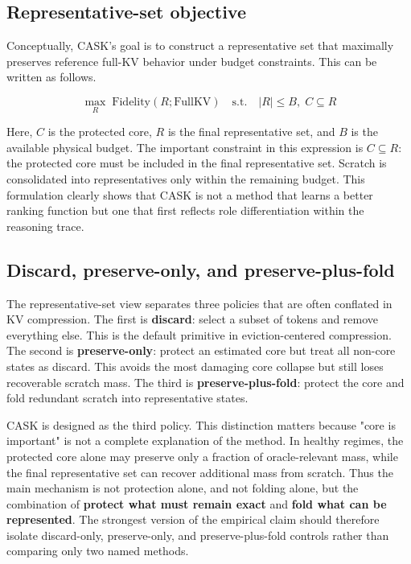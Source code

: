 \subsection{Representative-set objective}


Conceptually, CASK's goal is to construct a representative set that maximally preserves reference full-KV behavior under budget constraints. This can be written as follows.


$$
\max_{R} \; \mathrm{Fidelity}(R; \mathrm{FullKV})
\quad
\text{s.t.}
\quad
|R| \le B,
\; C \subseteq R
$$


Here, $C$ is the protected core, $R$ is the final representative set, and $B$ is the available physical budget. The important constraint in this expression is $C \subseteq R$: the protected core must be included in the final representative set. Scratch is consolidated into representatives only within the remaining budget. This formulation clearly shows that CASK is not a method that learns a better ranking function but one that first reflects role differentiation within the reasoning trace.


\subsection{Discard, preserve-only, and preserve-plus-fold}


The representative-set view separates three policies that are often conflated in KV compression. The first is \textbf{discard}: select a subset of tokens and remove everything else. This is the default primitive in eviction-centered compression. The second is \textbf{preserve-only}: protect an estimated core but treat all non-core states as discard. This avoids the most damaging core collapse but still loses recoverable scratch mass. The third is \textbf{preserve-plus-fold}: protect the core and fold redundant scratch into representative states.


CASK is designed as the third policy. This distinction matters because "core is important" is not a complete explanation of the method. In healthy regimes, the protected core alone may preserve only a fraction of oracle-relevant mass, while the final representative set can recover additional mass from scratch. Thus the main mechanism is not protection alone, and not folding alone, but the combination of \textbf{protect what must remain exact} and \textbf{fold what can be represented}. The strongest version of the empirical claim should therefore isolate discard-only, preserve-only, and preserve-plus-fold controls rather than comparing only two named methods.


